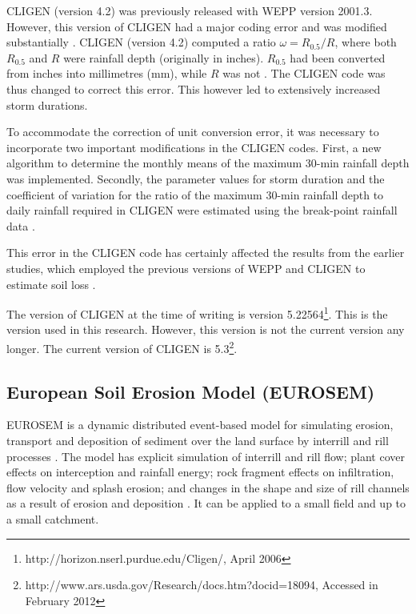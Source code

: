 CLIGEN (version 4.2) was previously released with WEPP version 2001.3. However,
this version of CLIGEN had a major coding error and was modified substantially
\citep{yu2000-301}. CLIGEN (version 4.2) computed a ratio $\omega = R_{0.5}/R$,
where both $R_{0.5}$ and $R$ were rainfall depth (originally in inches).
$R_{0.5}$ had been converted from inches into millimetres (mm), while $R$ was
not \citep{yu2000-301}. The CLIGEN code was thus changed to correct this error.
This however led to extensively increased storm durations.

To accommodate the correction of unit conversion error, it was necessary to
incorporate two important modifications in the CLIGEN codes. First, a new
algorithm to determine the monthly means of the maximum 30-min rainfall depth
was implemented. Secondly, the parameter values for storm duration and the
coefficient of variation for the ratio of the maximum 30-min rainfall depth to
daily rainfall required in CLIGEN were estimated using the break-point rainfall
data \citep{yu2000-301}.

This error in the CLIGEN code has certainly affected the results from the
earlier studies, which employed the previous versions of WEPP and CLIGEN to
estimate soil loss
\citep{truman1993-405,zhang1995-1069,zhang1995-1079,zhang1996-855,
baffaut1996-447,laflen1997-96,baffaut1998-756,favis-mortlock1999-329}.

The version of CLIGEN at the time of writing is version
5.22564\footnote{http://horizon.nserl.purdue.edu/Cligen/, April 2006}. This is
the version used in this research. However, this version is not the current
version any longer. The current version of CLIGEN is
5.3\footnote{http://www.ars.usda.gov/Research/docs.htm?docid=18094, Accessed in
February 2012}.

\subsection{European Soil Erosion Model (EUROSEM)}
\label{sec:EuropeanSoilErosionModelEUROSEM}

EUROSEM is a dynamic distributed event-based model for simulating erosion,
transport and deposition of sediment over the land surface by interrill and rill
processes \citep{morgan1998-389}. The model has explicit simulation of interrill
and rill flow; plant cover effects on interception and rainfall energy; rock
fragment effects on infiltration, flow velocity and splash erosion; and changes
in the shape and size of rill channels as a result of erosion and deposition
\citep{morgan1998-389}. It can be applied to a small field and up to a small
catchment.

